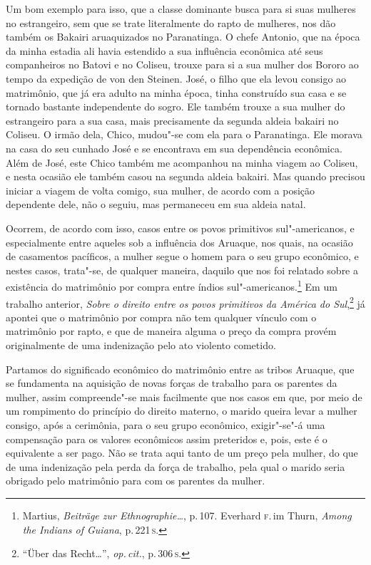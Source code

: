 Um bom exemplo para isso, que a classe dominante busca para si suas
mulheres no estrangeiro, sem que se trate literalmente do rapto de
mulheres, nos dão também os Bakairi aruaquizados no Paranatinga. O
chefe Antonio, que na época da minha estadia ali havia estendido a sua
influência econômica até seus companheiros no Batovi e no Coliseu,
trouxe para si a sua mulher dos Bororo ao tempo da expedição de von den
Steinen. José, o filho que ela levou consigo ao matrimônio, que já era
adulto na minha época, tinha construído sua casa e se tornado bastante
independente do sogro. Ele também trouxe a sua mulher do estrangeiro
para a sua casa, mais precisamente da segunda aldeia bakairi no Coliseu.
O irmão dela, Chico, mudou"-se com ela para o Paranatinga. Ele morava na
casa do seu cunhado José e se encontrava em sua dependência econômica.
Além de José, este Chico também me acompanhou na minha viagem ao
Coliseu, e nesta ocasião ele também casou na segunda aldeia bakairi. Mas
quando precisou iniciar a viagem de volta comigo, sua mulher, de
acordo com a posição dependente dele, não o seguiu, mas permaneceu em
sua aldeia natal.

Ocorrem, de acordo com isso, casos entre os povos primitivos
sul"-americanos, e especialmente entre aqueles sob a influência dos
Aruaque, nos quais, na ocasião de casamentos pacíficos, a mulher segue
o homem para o seu grupo econômico, e nestes casos, trata"-se, de
qualquer maneira, daquilo que nos foi relatado sobre a existência do
matrimônio por compra entre índios
sul"-americanos.\footnote{Martius, \textit{Beiträge zur Ethnographie\ldots}, p.\,107. Everhard \textsc{f}.\,im
  Thurn, \textit{Among the Indians of Guiana}, p.\,221\,\textsc{s}.} Em um trabalho
anterior, \textit{Sobre o direito entre os povos primitivos da América do
Sul},\footnote{``Über das Recht\ldots'', \textit{op.\,cit.}, p.\,306\,\textsc{s}.} já apontei que o
matrimônio por compra não tem qualquer vínculo com o matrimônio por
rapto, e que de maneira alguma o preço da compra provém originalmente de
uma indenização pelo ato violento cometido. 

Partamos do significado
econômico do matrimônio entre as tribos Aruaque, que se fundamenta na
aquisição de novas forças de trabalho para os parentes da mulher, assim
compreende"-se mais facilmente que nos casos em que, por meio de um
rompimento do princípio do direito materno, o marido queira levar a mulher
consigo, após a cerimônia, para o seu grupo econômico, exigir"-se"-á uma
compensação para os valores econômicos assim preteridos e, pois, este é
o equivalente a ser pago. Não se trata aqui tanto de um preço pela
mulher, do que de uma indenização pela perda da força de trabalho, pela
qual o marido seria obrigado pelo matrimônio para com os parentes da
mulher.

